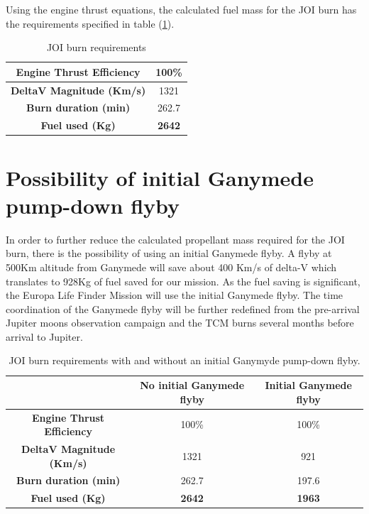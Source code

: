 Using the engine thrust equations, the calculated fuel mass for the JOI burn has the requirements specified in table (\ref{tab:joi_burn_req}).

\begin{table}[htb!]
  \centering
    \begin{tabular}{|c|c|}
    \hline
    \textbf{Engine Thrust Efficiency} & 100\% \bigstrut\\
    \hline
    \textbf{DeltaV Magnitude (Km/s)} & 1321\bigstrut\\
    \hline
    \textbf{Burn duration (min)} & 262.7\bigstrut\\
    \hline
    \textbf{Fuel used (Kg)} & \textbf{2642}\bigstrut\\
    \hline
    \end{tabular}%
    \caption{JOI burn requirements}
  \label{tab:joi_burn_req}%
\end{table}%
\newpage
\section{Possibility of initial Ganymede pump-down flyby}
In order to further reduce the calculated propellant mass required for the JOI burn, there is the possibility of using an initial Ganymede flyby. A flyby at 500Km altitude from Ganymede will save about 400 Km/s of delta-V \cite{clipper} which translates to 928Kg of fuel saved for our mission. As the fuel saving is significant, the Europa Life Finder Mission will use the initial Ganymede flyby. The time coordination of the Ganymede flyby will be further redefined from the pre-arrival Jupiter moons observation campaign and the TCM burns several months before arrival to Jupiter.

\begin{table}[htb!]
  \centering
    \begin{tabular}{|c|c|c|}
    \hline
    \textbf{} & No initial Ganymede flyby & Initial Ganymede flyby \bigstrut\\
    \hline
    \textbf{Engine Thrust Efficiency} & 100\% & 100\% \bigstrut\\
    \hline
    \textbf{DeltaV Magnitude (Km/s)} & 1321  & 921 \bigstrut\\
    \hline
    \textbf{Burn duration (min)} & 262.7 & 197.6 \bigstrut\\
    \hline
    \textbf{Fuel used (Kg)} & \textbf{2642} & \textbf{1963} \bigstrut\\
    \hline
    \end{tabular}%
    \caption{JOI burn requirements with and without an initial Ganymyde pump-down flyby.}
  \label{tab:joi_burn}%
\end{table}%

